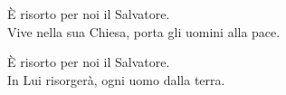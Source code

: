 

\spazio

\strofa È risorto per noi il Salvatore.\\
Vive nella sua Chiesa, porta gli uomini alla pace.

\spazio


\spazio

\strofa È risorto per noi il Salvatore.\\
In Lui risorgerà, ogni uomo dalla terra.

\spazio

